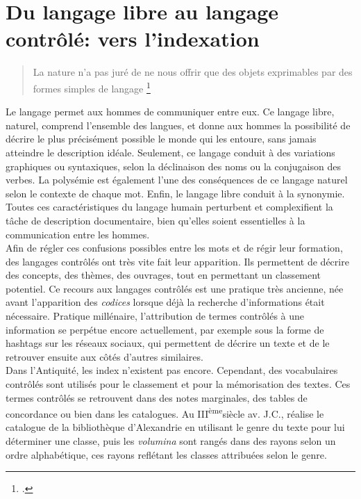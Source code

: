 \section{\label{I-A-1}Du langage libre au langage contrôlé: vers l'indexation}

\begin{quote}
	\og La nature n'a pas juré de ne nous offrir que des objets exprimables par des formes simples de langage \footcite[p.18]{valery_variete_1936} \fg{}
\end{quote}

Le langage permet aux hommes de communiquer entre eux. Ce langage libre, naturel, comprend l'ensemble des langues, et donne aux hommes la possibilité de décrire le plus précisément possible le monde qui les entoure, sans jamais atteindre le description idéale. Seulement, ce langage conduit à des variations graphiques ou syntaxiques, selon la déclinaison des noms ou la conjugaison des verbes. La polysémie est également l'une des conséquences de ce langage naturel selon le contexte de chaque mot. Enfin, le langage libre conduit à la synonymie. Toutes ces caractéristiques du langage humain perturbent et complexifient la tâche de description documentaire, bien qu'elles soient essentielles à la communication entre les hommes.\\

Afin de régler ces confusions possibles entre les mots et de régir leur formation, des langages contrôlés ont très vite fait leur apparition. Ils permettent de décrire des concepts, des thèmes, des ouvrages, tout en permettant un classement potentiel. Ce recours aux langages contrôlés est une pratique très ancienne, née avant l'apparition des \textit{codices} lorsque déjà la recherche d'informations était nécessaire. Pratique millénaire, l'attribution de termes contrôlés à une information se perpétue encore actuellement, par exemple sous la forme de \og hashtags\fg{} sur les réseaux sociaux, qui permettent de décrire un texte et de le retrouver ensuite aux côtés d'autres similaires.\\

Dans l'Antiquité, les index n'existent pas encore. Cependant, des vocabulaires contrôlés sont utilisés pour le classement et pour la mémorisation des textes. Ces termes contrôlés se retrouvent dans des notes marginales, des tables de concordance ou bien dans les catalogues. Au \textsc{III}\textsuperscript{ème}siècle av. J.C.,  réalise le catalogue de la bibliothèque d'Alexandrie en utilisant le genre du texte pour lui déterminer une classe, puis les \textit{volumina} sont rangés dans des rayons selon un ordre alphabétique, ces rayons reflétant les classes attribuées selon le genre.\\

